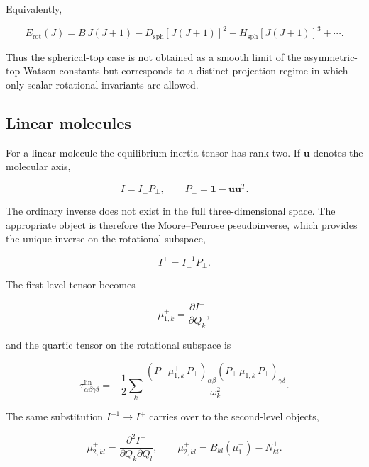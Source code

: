 \documentclass[aip,jcp,reprint,floatfix]{revtex4-2}
\begin{document}
Equivalently,

\begin{equation}
E_{\mathrm{rot}}(J)
=
B\,J(J+1)
-D_{\mathrm{sph}}[J(J+1)]^2
+H_{\mathrm{sph}}[J(J+1)]^3+\cdots .
\end{equation}

Thus the spherical-top case is not obtained as a smooth limit of the
asymmetric-top Watson constants but corresponds to a distinct
projection regime in which only scalar rotational invariants are
allowed.

\subsection{Linear molecules}

For a linear molecule the equilibrium inertia tensor has rank two. If
$\mathbf u$ denotes the molecular axis,

\begin{equation}
I = I_{\perp} P_{\perp},
\qquad
P_{\perp} = \mathbf 1-\mathbf u\mathbf u^T .
\end{equation}

The ordinary inverse does not exist in the full three-dimensional
space. The appropriate object is therefore the Moore–Penrose
pseudoinverse, which provides the unique inverse on the rotational
subspace,

\begin{equation}
I^+ = I_{\perp}^{-1} P_{\perp}.
\end{equation}

The first-level tensor becomes

\begin{equation}
\mu_{1,k}^{+} = \frac{\partial I^+}{\partial Q_k},
\end{equation}

and the quartic tensor on the rotational subspace is

\begin{equation}
\tau_{\alpha\beta\gamma\delta}^{\mathrm{lin}}
=
-\frac12
\sum_k
\frac{
\left(P_{\perp}\,\mu_{1,k}^{+}\,P_{\perp}\right)_{\alpha\beta}
\left(P_{\perp}\,\mu_{1,k}^{+}\,P_{\perp}\right)_{\gamma\delta}
}{\omega_k^2}.
\label{eq:app_linear_tau}
\end{equation}

The same substitution $I^{-1}\to I^+$ carries over to the second-level
objects,

\begin{equation}
\mu_{2,kl}^{+}
=
\frac{\partial^2 I^+}{\partial Q_k\partial Q_l},
\qquad
\mu_{2,kl}^{+} = B_{kl}(\mu_1^{+})-N_{kl}^{+}.
\end{equation}
\end{document}
